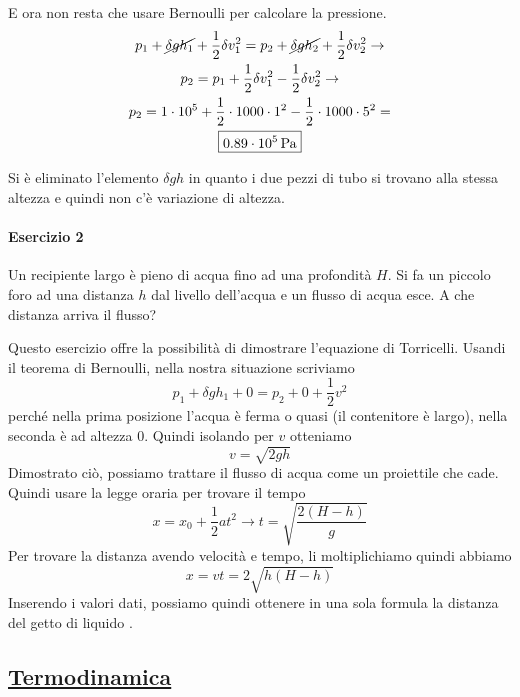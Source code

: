 E ora non resta che usare Bernoulli per	calcolare la pressione.
\begin{gather*}
  p_1 + \cancel{\delta gh_1} + 
  \frac{1}{2}\delta v_1^2 = 
  p_2 + \cancel{\delta gh_2} +
  \frac{1}{2}\delta v_2^2 \rightarrow \\
  p_2 = p_1 + \frac{1}{2}\delta v_1^2 - \frac{1}{2}\delta v_2^2 \rightarrow\\
  p_2 = 1\cdot10^5 + \frac{1}{2}\cdot1000\cdot1^2 - \frac{1}{2}\cdot1000\cdot5^2 =\\
  \boxed{0.89\cdot10^5\,\text{Pa}}
\end{gather*}

Si è eliminato l'elemento $\delta gh$ in quanto i due pezzi di tubo si trovano alla stessa altezza
e quindi non c'è variazione di altezza.

\paragraph{Esercizio 2}
Un recipiente largo è pieno di acqua fino ad una profondità $H$. Si fa un piccolo foro ad una 
distanza $h$ dal livello dell'acqua e un flusso di acqua esce. A che distanza arriva il flusso?
\divisor

Questo esercizio offre la possibilità di dimostrare l'equazione di Torricelli. Usandi il teorema di
Bernoulli, nella nostra situazione scriviamo
\begin{equation*}
  p_1+\delta gh_1+0=p_2+0+\frac{1}{2}v^2
\end{equation*}
perché nella prima posizione l'acqua è ferma o quasi (il contenitore è largo), nella seconda è ad 
altezza $0$. Quindi isolando per $v$ otteniamo
\begin{equation*}
  v=\sqrt{2gh}
\end{equation*}
Dimostrato ciò, possiamo trattare il flusso di acqua come un proiettile che cade. Quindi usare la 
legge oraria per trovare il tempo
\begin{equation*}
  x=x_0+\frac{1}{2}at^2 \rightarrow t = \sqrt{\frac{2(H-h)}{g}}
\end{equation*}
Per trovare la distanza avendo velocità e tempo, li moltiplichiamo quindi abbiamo
\begin{equation*}
  \boxed{x = vt = 2\sqrt{h(H-h)}}
\end{equation*}
Inserendo i valori dati, possiamo quindi ottenere in una sola formula la distanza del getto di liquido
.

\subsection*{\hyperref[sec:termodinamica]{Termodinamica}}\label{ex:termodinamica}

